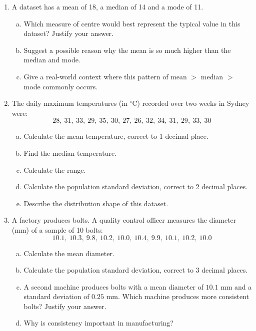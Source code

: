 \documentclass{article}
\begin{document}
\begin{enumerate}
  \item A dataset has a mean of 18, a median of 14 and a mode of 11.
  \begin{enumerate}[(a)]
    \item Which measure of centre would best represent the typical value in this dataset? Justify your answer.
    \item Suggest a possible reason why the mean is so much higher than the median and mode.
    \item Give a real-world context where this pattern of mean $>$ median $>$ mode commonly occurs.
  \end{enumerate}

  \item The daily maximum temperatures (in $^\circ$C) recorded over two weeks in Sydney were:
  \[
    28,\ 31,\ 33,\ 29,\ 35,\ 30,\ 27,\ 26,\ 32,\ 34,\ 31,\ 29,\ 33,\ 30
  \]
  \begin{enumerate}[(a)]
    \item Calculate the mean temperature, correct to 1 decimal place.
    \item Find the median temperature.
    \item Calculate the range.
    \item Calculate the population standard deviation, correct to 2 decimal places.
    \item Describe the distribution shape of this dataset.
  \end{enumerate}

  \item A factory produces bolts. A quality control officer measures the diameter (mm) of a sample of 10 bolts:
  \[
    10.1,\ 10.3,\ 9.8,\ 10.2,\ 10.0,\ 10.4,\ 9.9,\ 10.1,\ 10.2,\ 10.0
  \]
  \begin{enumerate}[(a)]
    \item Calculate the mean diameter.
    \item Calculate the population standard deviation, correct to 3 decimal places.
    \item A second machine produces bolts with a mean diameter of $10.1$ mm and a standard deviation of $0.25$ mm. Which machine produces more consistent bolts? Justify your answer.
    \item Why is consistency important in manufacturing? 
  \end{enumerate}


\end{enumerate}
\end{document}
